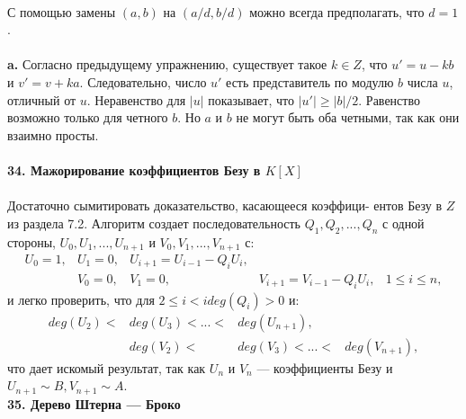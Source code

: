 \\
\hspace*{15pt}С помощью замены $(a, b)$ на $(a/d, b/d)$  можно всегда предполагать,\linebreak
что $d = 1$.\\
\\
\hspace*{15pt}\textbf{a.} Согласно предыдущему упражнению, существует такое $k \in Z$,\linebreak
что $u' = u - kb$ и $v' = v+ka$. Следовательно, число $u'$ есть представитель\linebreak
по модулю $b$ числа $u$, отличный от $u$. Неравенство для $|u|$ показывает,\linebreak
что $|u'| \geq |b|/2$. Равенство возможно только для четного $b$. Но $a$ и $b$ не\linebreak
могут быть оба четными, так как они взаимно просты.\\
\\
\noindent\textbf{34. Мажорирование коэффициентов Безу в $K[X]$}\\
\\
\hspace*{15pt}Достаточно сымитировать доказательство, касающееся коэффици-­\linebreak
ентов Безу в $Z$ из раздела 7.2. Алгоритм создает последовательность\linebreak
$Q_1, Q_2, ..., Q_n$  с одной стороны, $U_0, U_1, ..., U_{n+1}$ и $V_0, V_1, ..., V_{n+1}$ с:
		$$\begin{array}{ccccc}
			U_0 = 1,& U_1 = 0, & U_{i+1} = U_{i-1} - Q_iU_i, &                               & \\
								& V_0 = 0, & V_1 = 0,                    & V_{i+1} = V_{i-1} - Q_iU_i, & 1 \leq i \leq n,
		\end{array}$$
и легко проверить, что для  $2 \leq i < i deg(Q_i) > 0$ и:
		$$\begin{array}{cccc}
			deg(U_2) <  & deg(U_3) < ... < & deg(U_{n+1}),     & \\
							      & deg(V_2) <       & deg(V_3) < ... <  & deg(V_{n+1}),
		\end{array}$$
\noindent
что дает искомый результат, так как $U_n$ и $V_n$ ---  коэффициенты Безу\linebreak
и $U_{n+1} \sim B, V_{n+1} \sim A$.\\

\pagebreak
\noindent\textbf{35. Дерево Штерна — Броко}\\

